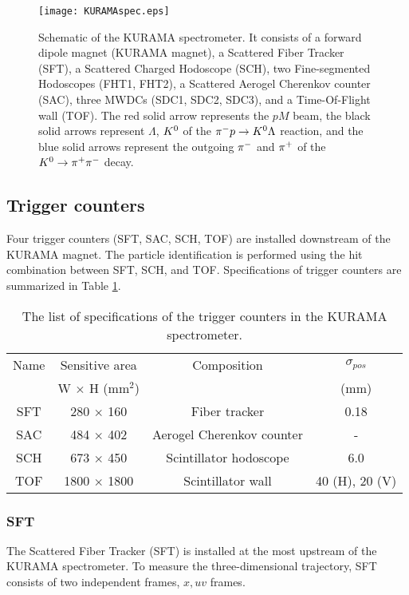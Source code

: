 \begin{figure}[!h]
 \begin{center}
   \texttt{[image: KURAMAspec.eps]}
   \caption{Schematic of the KURAMA spectrometer. It consists of a forward dipole magnet (KURAMA magnet), a Scattered Fiber Tracker (SFT), a Scattered Charged Hodoscope (SCH), two Fine-segmented Hodoscopes (FHT1, FHT2), a Scattered Aerogel Cherenkov counter (SAC), three MWDCs (SDC1, SDC2, SDC3), and a Time-Of-Flight wall (TOF). The red solid arrow represents the $pM$ beam, the black solid arrows represent $\Lambda$, $K^{0}$ of the $\pi^- p \to K^0 \Lambda$ reaction, and the blue solid arrows represent the outgoing $\pi^{-}$ and $\pi^{+}$ of the $K^0 \to \pi^+ \pi^-$ decay.}
   \label{fig-KURAMAspec}
 \end{center}
\end{figure}

%
\subsection{Trigger counters}
Four trigger counters (SFT, SAC, SCH, TOF) are installed downstream of the KURAMA magnet. The particle identification is performed using the hit combination between SFT, SCH, and TOF. Specifications of trigger counters are summarized in Table \ref{tab-KURAMAspec-trig}.

\begin{table}[h]
  \begin{center}
    \caption{The list of specifications of the trigger counters in the KURAMA spectrometer.}
    \begin{tabular}{cccc} \hline \hline
      Name & Sensitive area & Composition & $\sigma_{pos}$ \\
       & W $\times$ H (mm$^2$) & & (mm) \\ \hline
      SFT& 280 $\times$ 160 & Fiber tracker & 0.18  \\
      SAC& 484 $\times$ 402 & Aerogel Cherenkov counter & -  \\
      SCH & 673 $\times$ 450 & Scintillator hodoscope & 6.0  \\ 
      TOF & 1800 $\times$ 1800 & Scintillator wall & 40 (H), 20 (V)  \\ 
\hline\hline
   \end{tabular}
   \label{tab-KURAMAspec-trig}
   \end{center}
\end{table}

%
\subsubsection{SFT}
The Scattered Fiber Tracker (SFT) is installed at the most upstream of the KURAMA spectrometer. To measure the three-dimensional trajectory, SFT consists of two independent frames, $x, uv$ frames.


